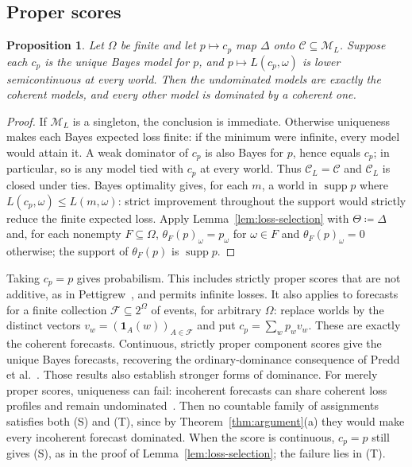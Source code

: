 \documentclass[11pt]{article}
\newtheorem{proposition}[theorem]{Proposition}
\theoremstyle{definition}
\theoremstyle{remark}
\newcommand{\M}{\mathcal M}
\newcommand{\C}{\mathcal C}
\newcommand{\supp}{\operatorname{supp}}
\begin{document}
\subsection{Proper scores}
\begin{proposition}\label{prop:short-proper}
Let $\Omega$ be finite and let $p\mapsto c_p$ map $\Delta$ onto $\C\subseteq\M_L$. Suppose each $c_p$ is the unique Bayes model for $p$, and $p\mapsto L(c_p,\omega)$ is lower semicontinuous at every world. Then the undominated models are exactly the coherent models, and every other model is dominated by a coherent one.
\end{proposition}
\begin{proof}
If $\M_L$ is a singleton, the conclusion is immediate. Otherwise uniqueness makes each Bayes expected loss finite: if the minimum were infinite, every model would attain it. {\color{red}A weak dominator of $c_p$ is also Bayes for $p$, hence equals $c_p$; in particular, so is any model tied with $c_p$ at every world. Thus $\C_L=\C$ and $\C_L$ is closed under ties. Bayes optimality gives, for each $m$, a world in $\supp p$ where $L(c_p,\omega)\le L(m,\omega)$: strict improvement throughout the support would strictly reduce the finite expected loss. Apply Lemma~\ref{lem:loss-selection} with $\Theta\coloneqq\Delta$ and, for each nonempty $F\subseteq\Omega$, $\theta_F(p)_\omega=p_\omega$ for $\omega\in F$ and $\theta_F(p)_\omega=0$ otherwise; the support of $\theta_F(p)$ is $\supp p$.}
\end{proof}
Taking $c_p=p$ gives probabilism. This includes strictly proper scores that are not additive, as in Pettigrew~\cite{Pettigrew2022}, and permits infinite losses. It also applies to forecasts for a finite collection $\mathcal F\subseteq2^\Omega$ of events, for arbitrary $\Omega$: replace worlds by the distinct vectors $v_w=(\mathbf1_A(w))_{A\in\mathcal F}$ and put $c_p=\sum_wp_wv_w$. These are exactly the coherent forecasts. Continuous, strictly proper component scores give the unique Bayes forecasts, recovering the ordinary-dominance consequence of Predd et al.~\cite{Predd2009}. Those results also establish stronger forms of dominance. For merely proper scores, uniqueness can fail: incoherent forecasts can share coherent loss profiles and remain undominated~\cite{SSK2009}. {\color{red}Then no countable family of assignments satisfies both {\color{red}(S)} and {\color{red}(T)}, since by Theorem~\ref{thm:argument}(a) they would make every incoherent forecast dominated. When the score is continuous, $c_p=p$ still gives {\color{red}(S)}, as in the proof of Lemma~\ref{lem:loss-selection}; {\color{red}the failure lies in (T).}}
\end{document}
